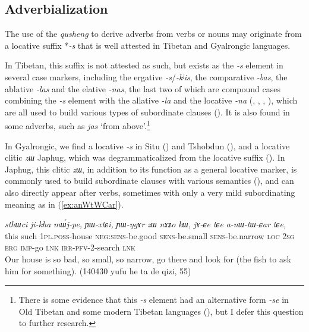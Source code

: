 \documentclass[oneside,a4paper,11pt]{article}
\newcommand{\ipa}[1]{{\phon\textit{\mbox{#1}}}}
\begin{document}
\subsection{Adverbialization}
The use of the \textit{qusheng}  to derive adverbs from verbs or nouns may originate from a locative suffix *\ipa{-s} that is well attested in Tibetan and Gyalrongic languages.

In Tibetan, this suffix is not attested as such, but exists as the \ipa{-s} element in several case markers, including the ergative \ipa{-s}/\ipa{-kʲis}, the comparative \ipa{-bas}, the ablative \ipa{-las} and the elative \ipa{-nas}, the last two of which are compound cases combining the \ipa{-s} element with the allative \ipa{-la} and the locative \ipa{-na} (\citet{konow09intro},  \citealt{delancey82ergative}, \citealt[282]{zeisler11kenhat}, \citealt{hill12bas}), which are all used to build various types of subordinate clauses (\citealt{tournadre10cases}). It is also found in some adverbs, such as \ipa{jas} `from above'.\footnote{There is some evidence that this \ipa{-s} element had an alternative form \ipa{-se} in Old Tibetan and some modern Tibetan languages (\citealt[280-284]{zeisler11kenhat}), but I defer this question to further research.}

In Gyalrongic, we find a locative \ipa{-s} in Situ (\citealt{linxr93jiarong}) and Tshobdun (\citealt[129]{jackson98morphology}), and a locative clitic \ipa{zɯ} Japhug, which was degrammaticalized from the locative suffix (\citealt[167-9]{jacques08}). In Japhug, this clitic \ipa{zɯ}, in addition to its function as a general locative marker, is commonly used to build subordinate clauses with various semantics (\citealt[275;293]{jacques14linking}), and can also directly appear after verbs, sometimes with only a very mild subordinating meaning as in (\ref{ex:anWtWCar}).

\begin{exe}
\ex \label{ex:anWtWCar}
\gll \ipa{kɯki} 	\ipa{sthɯci} 	\ipa{ji-kha} 	\ipa{mɯ́j-pe,} 	\ipa{ɲɯ-xtɕi,} 	\ipa{ɲɯ-ŋgɤr} 	\ipa{zɯ} 	\ipa{nɤʑo} 	\ipa{kɯ,}  \ipa{jɤ-ɕe} 	\ipa{tɕe} 	\ipa{a-nɯ-tɯ-ɕar} 	\ipa{tɕe,}  \\
this such \textsc{1pl.poss}-house \textsc{neg:sens}-be.good  \textsc{sens}-be.small  \textsc{sens}-be.narrow \textsc{loc} \textsc{2sg} \textsc{erg} \textsc{imp}-go \textsc{lnk}  \textsc{irr-pfv}-2-search \textsc{lnk} \\
\glt Our house is so bad, so small, so narrow, go there and look for (the fish to ask him for something). (140430 yufu he ta de qizi, 55)
\end{exe}
\end{document}
